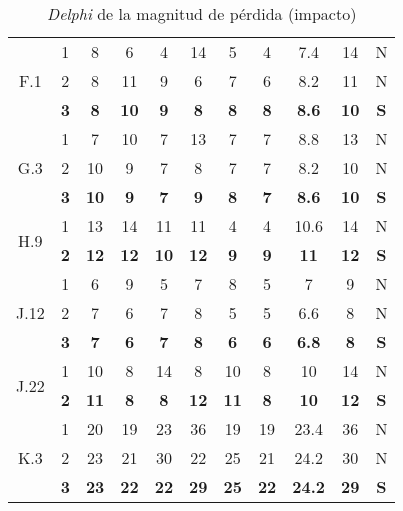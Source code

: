 \documentclass[11pt,a4paper,spanish,twoside]{book}
\begin{document}
\begin{table}[!h]
\begin{tabular}{|c|c||c|c|c|c|c||c|c|c||c|}
    \hline \multirow{3}{*}{F.1} 
    & 1 & 8 & 6  & 4 & 14 & 5 & 4 & 7.4 & 14 & N \\
    & 2 & 8 & 11 & 9 & 6  & 7 & 6 & 8.2 & 11 & N \\
    & \textbf{3} & \textbf{8} & \textbf{10} & \textbf{9} & \textbf{8} &
    \textbf{8} & \textbf{8} & \textbf{8.6} & \textbf{10} & \textbf{S} \\ 
    
    \hline \multirow{3}{*}{G.3} 
    & 1 & 7  & 10 & 7 & 13 & 7 & 7 & 8.8 & 13 & N \\
    & 2 & 10 & 9  & 7 & 8  & 7 & 7 & 8.2 & 10 & N \\
    & \textbf{3} & \textbf{10} & \textbf{9} & \textbf{7} & \textbf{9} &
    \textbf{8} & \textbf{7} & \textbf{8.6} & \textbf{10} & \textbf{S} \\ 
    
    \hline \multirow{2}{*}{H.9} 
    & 1 & 13 & 14 & 11 & 11 & 4 & 4 & 10.6 & 14 & N \\
    & \textbf{2} & \textbf{12} & \textbf{12} & \textbf{10} & \textbf{12} &
    \textbf{9} & \textbf{9} & \textbf{11} & \textbf{12} & \textbf{S} \\ 

    \hline \multirow{3}{*}{J.12} 
    & 1 & 6 & 9 & 5 & 7 & 8 & 5 & 7   & 9 & N \\
    & 2 & 7 & 6 & 7 & 8 & 5 & 5 & 6.6 & 8 & N \\
    & \textbf{3} & \textbf{7} & \textbf{6} & \textbf{7} & \textbf{8} &
    \textbf{6} & \textbf{6} & \textbf{6.8} & \textbf{8} & \textbf{S} \\ 

    \hline \multirow{2}{*}{J.22} 
    & 1 & 10 & 8 & 14 & 8 & 10 & 8 & 10 & 14 & N \\
    & \textbf{2} & \textbf{11} & \textbf{8} & \textbf{8} & \textbf{12} &
    \textbf{11} & \textbf{8} & \textbf{10} & \textbf{12} & \textbf{S} \\ 

    \hline \multirow{3}{*}{K.3} 
    & 1 & 20 & 19 & 23 & 36 & 19 & 19 & 23.4 & 36 & N \\
    & 2 & 23 & 21 & 30 & 22 & 25 & 21 & 24.2 & 30 & N \\
    & \textbf{3} & \textbf{23} & \textbf{22} & \textbf{22} & \textbf{29} &
    \textbf{25} & \textbf{22} & \textbf{24.2} & \textbf{29} & \textbf{S} \\ 
    \hline
  \end{tabular}
  \caption{\emph{Delphi} de la magnitud de pérdida (impacto)}
  \label{Tab:DELPHImag}
\end{table}
\end{document}
